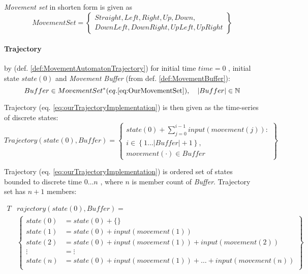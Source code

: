 \begin{note}
    \emph{Movement set} in shorten form is given as
    \begin{equation}\label{eq:OurMovementSet}
        Movement Set= \left\{
        \begin{gathered}
            Straight, Left,Right, Up, Down,\\
            Down Left, Down Right,  Up Left,   Up Right
        \end{gathered}
        \right\}
    \end{equation}
\end{note}

\paragraph{Trajectory} by (def. \ref{def:MovementAutomatonTrajectory}) for initial time $time = 0$ , initial state $state(0)$ and \emph{Movement Buffer} (from def. \ref{def:MovementBuffer}):
\begin{equation}\label{eq:ourBuffer}
    Buffer \in Movement Set^* (eq. \ref{eq:OurMovementSet}), \quad  |Buffer| \in \mathbb{N}
\end{equation}

\noindent Trajectory (eq. \ref{eq:ourTrajectoryImplementation}) is then given as the time-series of discrete states:
\begin{equation}\label{eq:ourTrajectoryImplementation}
    Trajectory(state(0),Buffer)= \left\{\begin{gathered}state(0)+\sum_{j=0}^{i-1} input(movement(j)):\\i \in\left\{1\dots |Buffer|+1\right\}, \\movement(\cdot) \in Buffer\end{gathered}\right\}
\end{equation}

\noindent Trajectory (eq. \ref{eq:ourTrajectoryImplementation}) is ordered set of states bounded to discrete time $0\dots n$ , where $n$ is member count of \emph{Buffer}. Trajectory set has $n+1$ members:

\begin{equation}
    \begin{aligned}
    T&rajectory(state(0),Buffer)=\\
        &\left\{
        \begin{aligned}
            state(0) &= state(0) + \{\}\\
            state(1) &= state(0) + input(movement(1))\\
            state(2) &= state(0) + input(movement(1)) +input(movement(2))\\
             \vdots  &= \vdots\\
            state(n) &= state(0) + input(movement(1))+\dots+input(movement(n))\\
        \end{aligned}
        \right\}
    \end{aligned}
\end{equation}

